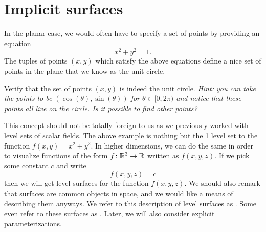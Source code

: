 \section{Implicit  surfaces}
                In the planar case, we would often have to specify a set of points by providing an equation
                \[
                x^2+y^2=1.
                \]
                The tuples of points $(x,y)$ which satisfy the above equations define a nice set of points in the plane that we know as the unit circle.  
                
                \begin{exercise}
                	Verify that the set of points $(x,y)$ is indeed the unit circle. \emph{Hint: you can take the points to be $(\cos(\theta),\sin(\theta))$ for $\theta \in [0,2\pi)$ and notice that these points all live on the circle. Is it possible to find other points?}
                 \end{exercise}
                
                This concept should not be totally foreign to us as we previously worked with level sets of scalar fields.  The above example is nothing but the 1 level set to the function $f(x,y)=x^2+y^2$.  In higher dimensions, we can do the same in order to visualize functions of the form $f\colon \mathbb{R}^3\to \mathbb{R}$ written as $f(x,y,z)$.  If we pick some constant $c$ and write
                \[
                f(x,y,z)=c
                \]
                then we will get level surfaces for the function $f(x,y,z)$.  We should also remark that surfaces are common objects in space, and we would like a means of describing them anyways. We refer to this description of level surfaces as . Some even refer to these surfaces as .  Later, we will also consider explicit parameterizations. 
                
